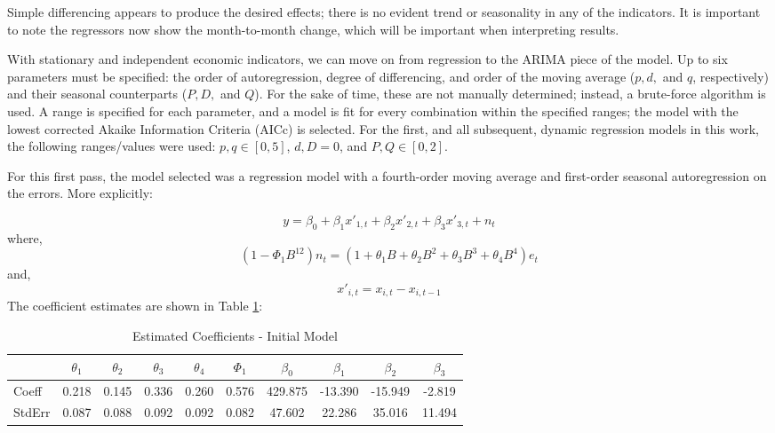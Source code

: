 \documentclass[12pt,letterpaper,toc=flat,oneside]{report}
\theoremstyle{definition}
\theoremstyle{definition}
\theoremstyle{definition}
\theoremstyle{remark}
\begin{document}
Simple differencing appears to produce the desired effects; there is no
evident trend or seasonality in any of the indicators. It is important
to note the regressors now show the month-to-month change, which will be
important when interpreting results.

With stationary and independent economic indicators, we can move on from
regression to the ARIMA piece of the model. Up to six parameters must be
specified: the order of autoregression, degree of differencing, and
order of the moving average (\(p,d,\) and \(q\), respectively) and their
seasonal counterparts (\(P,D,\) and \(Q\)). For the sake of time, these
are not manually determined; instead, a brute-force algorithm is used. A
range is specified for each parameter, and a model is fit for every
combination within the specified ranges; the model with the lowest
corrected Akaike Information Criteria (AICc) is selected. For the first,
and all subsequent, dynamic regression models in this work, the
following ranges/values were used: \(p,q \in [0,5]\), \(d,D = 0\), and
\(P, Q \in [0,2]\).

For this first pass, the model selected was a regression model with a
fourth-order moving average and first-order seasonal autoregression on
the errors. More explicitly:

\[ y = \beta_0 + \beta_1x'_{1,t} + \beta_2x'_{2,t} + \beta_3x'_{3,t} + n_t\]
where,
\[ (1-\Phi_1 B^{12})n_t = (1 + \theta_1B + \theta_2B^2 + \theta_3B^3 + \theta_4 B^4)e_t \]
and, \[ x'_{i,t} = x_{i,t} - x_{i,t-1}\] The coefficient estimates are
shown in Table \ref{tab:dynreg1-coeff}:

\begin{table}

\caption{\label{tab:dynreg1-coeff}Estimated Coefficients - Initial Model}
\centering
\begin{tabular}[t]{l|c|c|c|c|c|c|c|c|c}
\hline
  & $\theta_1$ & $\theta_2$ & $\theta_3$ & $\theta_4$ & $\Phi_1$ & $\beta_0$ & $\beta_1$ & $\beta_2$ & $\beta_3$\\
\hline
Coeff & 0.218 & 0.145 & 0.336 & 0.260 & 0.576 & 429.875 & -13.390 & -15.949 & -2.819\\
\hline
StdErr & 0.087 & 0.088 & 0.092 & 0.092 & 0.082 & 47.602 & 22.286 & 35.016 & 11.494\\
\hline
\end{tabular}
\end{table}
\end{document}
